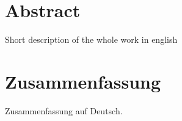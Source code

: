 \chapter*{Abstract}
Short description of the whole work in english

\chapter*{Zusammenfassung}
Zusammenfassung auf Deutsch.